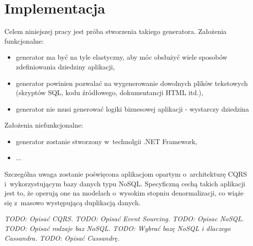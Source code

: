 \chapter{Implementacja} \label{chap:implementation}

Celem niniejszej pracy jest próba stworzenia takiego generatora.
Założenia funkcjonalne:

\begin{itemize}
 \item generator ma być na tyle elastyczny, aby móc obsłużyć wiele sposobów zdefiniowania dziedziny aplikacji,
 \item generator powinien pozwalać na wygenerowanie dowolnych plików tekstowych (skryptów SQL, kodu źródłowego, dokumentancji HTML itd.),
 \item generator nie musi generować logiki biznesowej aplikacji - wystarczy dziedzina
\end{itemize}

Założenia niefunkcjonalne:

\begin{itemize}
 \item generator zostanie stworzony w~technolgii .NET Framework,
 \item ...
\end{itemize}

Szczególna uwaga zostanie poświęcona aplikacjom opartym o~architekturę CQRS i~wykorzystującym bazy danych typu NoSQL.
Specyficzną cechą takich aplikacji jest to, że operują one na modelach o~wysokim stopniu denormalizacji, co wiąże się z~masowo występującą duplikacją danych.

\emph{TODO: Opisać CQRS.}
\emph{TODO: Opisać Event Sourcing.}
\emph{TODO: Opisac NoSQL.}
\emph{TODO: Opisać rodzaje baz NoSQL.}
\emph{TODO: Wybrać bazę NoSQL i dlaczego Cassandra.}
\emph{TODO: Opisać Cassandrę.}
